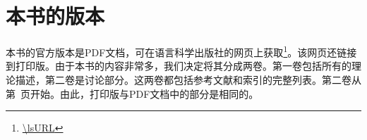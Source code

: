 
\section*{本书的版本}

本书的官方版本是PDF文档，可在语言科学出版社的网页上获取\footnote{
\url{\lsURL}
}。该网页还链接到打印版。由于本书的内容非常多，我们决定将其分成两卷。第一卷包括所有的理论描述，第二卷是讨论部分。这两卷都包括参考文献和索引的完整列表。第二卷从第~\pageref{part-discussion}页开始。由此，打印版与PDF文档中的部分是相同的。







